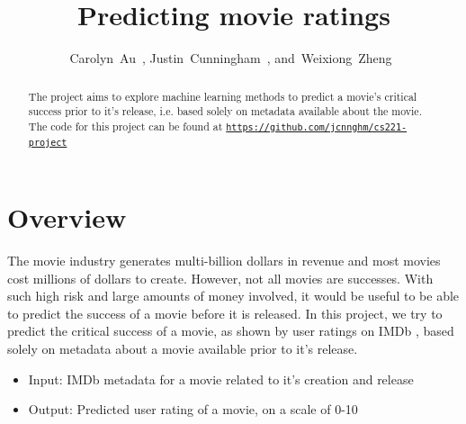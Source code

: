 \documentclass[journal]{IEEEtran}
\begin{document}
\title{Predicting movie ratings}

\author{Carolyn~Au~,
        Justin~Cunningham~,
        and~Weixiong~Zheng~}

%
{}

\maketitle


\begin{abstract}
The project aims to explore machine learning methods to predict a movie's critical success prior
to it's release, i.e. based solely on metadata available about the movie. The code for this project
can be found at \texttt{\url{https://github.com/jcnnghm/cs221-project}}
\end{abstract}


\section{Overview}
The movie industry generates multi-billion dollars in revenue and most movies
cost millions of dollars to create.  However, not all movies are successes.
With such high risk and large amounts of money involved, it would be useful to
be able to predict the success of a movie before it is released. In this
project, we try to predict the critical success of a movie, as shown by user
ratings on IMDb \cite{imdb}, based solely on metadata about a movie available prior to it's
release.
\\
\begin{itemize}
    \item Input: IMDb metadata for a movie related to it's creation and release
    \item Output: Predicted user rating of a movie, on a scale of 0-10
\end{itemize}
\end{document}
